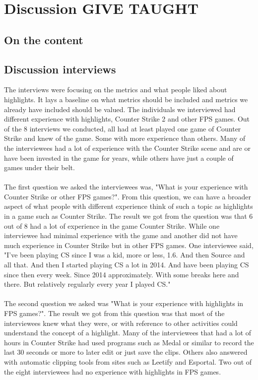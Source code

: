 
\chapter{Discussion GIVE TAUGHT}
\label{chp:discussion}
\section{On the content}
\section{Discussion interviews}
The interviews were focusing on the metrics and what people liked about highlights. It lays a baseline on what metrics should be included and metrics we already have included should be valued. The individuals we interviewed had different experience with highlights, Counter Strike 2 and other FPS games. Out of the 8 interviews we conducted, all had at least played one game of Counter Strike and knew of the game. Some with more experience than others. Many of the interviewees had a lot of experience with the Counter Strike scene and are or have been invested in the game for years, while others have just a couple of games under their belt.\\\\
The first question we asked the interviewees was, "What is your experience with Counter Strike or other FPS games?". From this question, we can have a broader aspect of what people with different experience think of such a topic as highlights in a game such as Counter Strike. The result we got from the question was that 6 out of 8 had a lot of experience in the game Counter Strike. While one interviewee had minimal experience with the game and another did not have much experience in Counter Strike but in other FPS games. One interviewee said, "I've been playing CS since I was a kid, more or less, 1.6. And then Source and all that. And then I started playing CS a lot in 2014. And have been playing CS since then every week. Since 2014 approximately. With some breaks here and there. But relatively regularly every year I played CS."\\\\
The second question we asked was "What is your experience with highlights in FPS games?". The result we got from this question was that most of the interviewees knew what they were, or with reference to other activities could understand the concept of a highlight. Many of the interviewees that had a lot of hours in Counter Strike had used programs such as Medal or similar to record the last 30 seconds or more to later edit or just save the clips. Others also answered with automatic clipping tools from sites such as Leetify and Esportal. Two out of the eight interviewees had no experience with highlights in FPS games.\\\\

